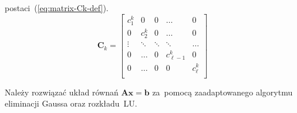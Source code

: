 \documentclass[../main.tex]{subfiles}
\newcommand{\AAA}{\mathbf{A}}
\newcommand{\CCC}{\mathbf{C}}
\begin{document}
    postaci~(\ref{eq:matrix-Ck-def}).
    \begin{equation} \label{eq:matrix-Ck-def}
      \CCC_k = \begin{bmatrix}
        c^k_1   & 0       & 0       & \hdots        & 0         \\
        0       & c^k_2   & 0       & \hdots        & 0         \\
        \vdots  & \ddots  & \ddots  & \ddots        & \hdots    \\
        0       & \hdots  & 0       & c^k_{\ell-1}  & 0         \\
        0       & \hdots  & 0       & 0             & c^k_\ell  \\
      \end{bmatrix}
    \end{equation}
    
    \begin{problem}
      Należy rozwiązać układ równań \( \AAA \mathbf{x} = \mathbf{b} \)
      za~pomocą zaadaptowanego algorytmu eliminacji Gaussa
      oraz rozkładu~LU.
    \end{problem}
\end{document}

